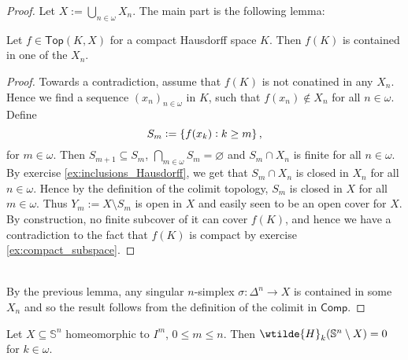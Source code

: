 \begin{proof}
	Let $X := \bigcup_{n \in \omega} X_n$. The main part is the following lemma:

	\begin{lemma}
		Let $f \in \mathsf{Top}(K,X)$ for a compact Hausdorff space $K$. Then $f(K)$ is contained in one of the $X_n$.	
	\end{lemma}

	\begin{proof}
		Towards a contradiction, assume that $f(K)$ is not conatined in any $X_n$. Hence we find a sequence $(x_n)_{n \in \omega}$ in $K$, such that $f(x_n) \notin X_n$ for all $n \in \omega$. Define
		\begin{equation*}
			S_m := \cbr[0]{f(x_k) : k \geq m},
		\end{equation*}
		\noindent for $m \in \omega$. Then $S_{m + 1} \subseteq S_m$, $\bigcap_{m \in \omega} S_m = \varnothing$ and $S_m \cap X_n$ is finite for all $n \in \omega$. By exercise \ref{ex:inclusions_Hausdorff}, we get that $S_m \cap X_n$ is closed in $X_n$ for all $n \in \omega$. Hence by the definition of the colimit topology, $S_m$ is closed in $X$ for all $m \in \omega$. Thus $Y_m := X \setminus S_m$ is open in $X$ and easily seen to be an open cover for $X$. By construction, no finite subcover of it can cover $f(K)$, and hence we have a contradiction to the fact that $f(K)$ is compact by exercise \ref{ex:compact_subspace}.
	\end{proof}\\
	By the previous lemma, any singular $n$-simplex $\sigma : \Delta^n \to X$ is contained in some $X_n$ and so the result follows from the definition of the colimit in $\mathsf{Comp}$.
\end{proof}

\begin{proposition}
	\label{prop:I_m}
	Let $X \subseteq \mathbb{S}^n$ homeomorphic to $I^m$, $0 \leq m \leq n$. Then $\wtilde{H}_k(\mathbb{S}^n \setminus X) = 0$ for $k \in \omega$.
\end{proposition}

